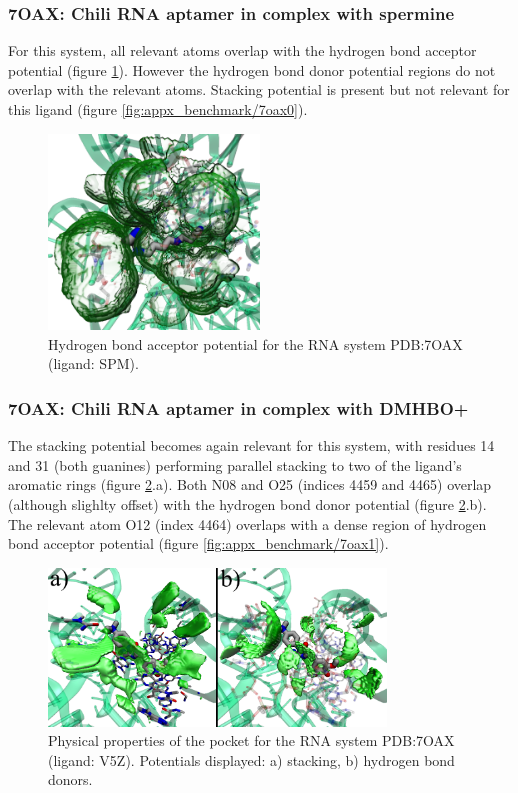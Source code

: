     \subsubsection{7OAX: Chili RNA aptamer in complex with spermine}
      For this system, all relevant atoms overlap with the hydrogen bond acceptor potential (figure \ref{fig:benchmark/7oax0}). However the hydrogen bond donor potential regions do not overlap with the relevant atoms. Stacking potential is present but not relevant for this ligand (figure \ref{fig:appx_benchmark/7oax0}).

      \begin{figure}[H]
        \centering
        \includegraphics[width=0.5\textwidth]{figures/results/benchmark_rna/7oax0.png}
        \caption{\label{fig:benchmark/7oax0} Hydrogen bond acceptor potential for the RNA system PDB:7OAX (ligand: SPM).}
      \end{figure}

    \subsubsection{7OAX: Chili RNA aptamer in complex with DMHBO+}
      The stacking potential becomes again relevant for this system, with residues 14 and 31 (both guanines) performing parallel stacking to two of the ligand's aromatic rings (figure \ref{fig:benchmark/7oax1}.a). Both N08 and O25 (indices 4459 and 4465) overlap (although slighlty offset) with the hydrogen bond donor potential (figure \ref{fig:benchmark/7oax1}.b). The relevant atom O12 (index 4464) overlaps with a dense region of hydrogen bond acceptor potential (figure \ref{fig:appx_benchmark/7oax1}).

      \begin{figure}[H]
        \centering
        \includegraphics[width=0.8\textwidth]{figures/results/benchmark_rna/7oax1.png}
        \caption{\label{fig:benchmark/7oax1} Physical properties of the pocket for the RNA system PDB:7OAX (ligand: V5Z). Potentials displayed: a) stacking, b) hydrogen bond donors.}
      \end{figure}

